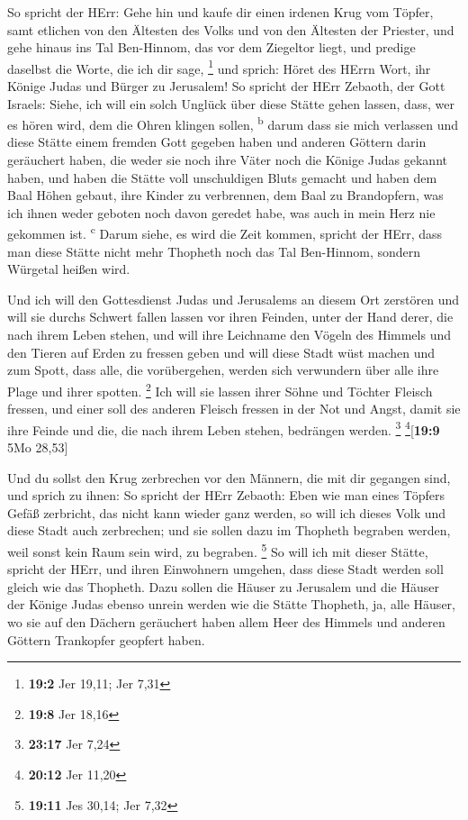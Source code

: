  So spricht der HErr: Gehe hin und kaufe dir einen irdenen
Krug vom Töpfer, samt etlichen von den Ältesten des Volks und von den
Ältesten der Priester,  und gehe hinaus ins Tal
Ben-Hinnom, das vor dem Ziegeltor liegt, und predige daselbst die Worte,
die ich dir sage, \footnote{\textbf{19:2} Jer 19,11; Jer 7,31}
 und sprich: Höret des HErrn Wort, ihr Könige Judas und
Bürger zu Jerusalem! So spricht der HErr Zebaoth, der Gott Israels:
Siehe, ich will ein solch Unglück über diese Stätte gehen lassen, dass,
wer es hören wird, dem die Ohren klingen sollen, \textsuperscript{b}
 darum dass sie mich verlassen und diese Stätte einem
fremden Gott gegeben haben und anderen Göttern darin geräuchert haben,
die weder sie noch ihre Väter noch die Könige Judas gekannt haben, und
haben die Stätte voll unschuldigen Bluts gemacht  und
haben dem Baal Höhen gebaut, ihre Kinder zu verbrennen, dem Baal zu
Brandopfern, was ich ihnen weder geboten noch davon geredet habe, was
auch in mein Herz nie gekommen ist. \textsuperscript{c} 
Darum siehe, es wird die Zeit kommen, spricht der HErr, dass man diese
Stätte nicht mehr Thopheth noch das Tal Ben-Hinnom, sondern Würgetal
heißen wird.

 Und ich will den Gottesdienst Judas und Jerusalems an
diesem Ort zerstören und will sie durchs Schwert fallen lassen vor ihren
Feinden, unter der Hand derer, die nach ihrem Leben stehen, und will
ihre Leichname den Vögeln des Himmels und den Tieren auf Erden zu
fressen geben  und will diese Stadt wüst machen und zum
Spott, dass alle, die vorübergehen, werden sich verwundern über alle
ihre Plage und ihrer spotten. \footnote{\textbf{19:8} Jer 18,16}
 Ich will sie lassen ihrer Söhne und Töchter Fleisch
fressen, und einer soll des anderen Fleisch fressen in der Not und
Angst, damit sie ihre Feinde und die, die nach ihrem Leben stehen,
bedrängen werden. \footnote{\textbf{23:17} Jer 7,24}
\footnote{\textbf{20:12} Jer 11,20}{[}\textbf{19:9} 5Mo 28,53{]}

 Und du sollst den Krug zerbrechen vor den Männern, die
mit dir gegangen sind,  und sprich zu ihnen: So spricht
der HErr Zebaoth: Eben wie man eines Töpfers Gefäß zerbricht, das nicht
kann wieder ganz werden, so will ich dieses Volk und diese Stadt auch
zerbrechen; und sie sollen dazu im Thopheth begraben werden, weil sonst
kein Raum sein wird, zu begraben. \footnote{\textbf{19:11} Jes 30,14;
  Jer 7,32}  So will ich mit dieser Stätte, spricht der
HErr, und ihren Einwohnern umgehen, dass diese Stadt werden soll gleich
wie das Thopheth.  Dazu sollen die Häuser zu Jerusalem
und die Häuser der Könige Judas ebenso unrein werden wie die Stätte
Thopheth, ja, alle Häuser, wo sie auf den Dächern geräuchert haben allem
Heer des Himmels und anderen Göttern Trankopfer geopfert haben.

